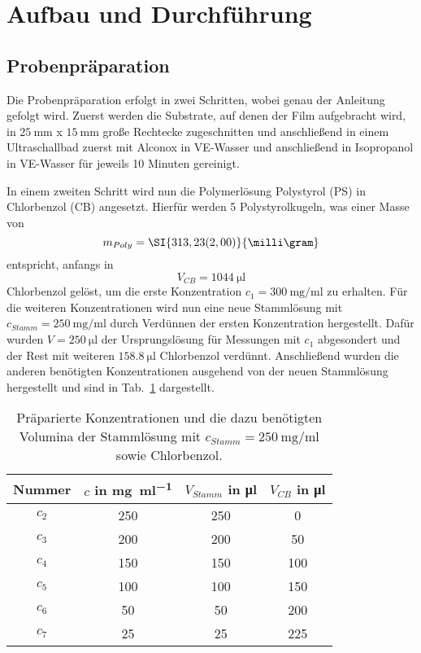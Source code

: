 \section{\label{sec:aufbau}Aufbau und Durchführung} %
\subsection{Probenpräparation}
Die Probenpräparation erfolgt in zwei Schritten, wobei genau der Anleitung~\cite[]{Anleitung} gefolgt wird. Zuerst werden die Substrate, auf denen der Film aufgebracht wird, in $\SI{25}{\milli\metre}$ x $\SI{15}{\milli\metre}$ große Rechtecke zugeschnitten und anschließend in einem Ultraschallbad zuerst mit Alconox in VE-Wasser und anschließend in Isopropanol in VE-Wasser für jeweils 10 Minuten gereinigt.

In einem zweiten Schritt wird nun die Polymerlösung Polystyrol (PS) in Chlorbenzol (CB) angesetzt. Hierfür werden 5 Polystyrolkugeln, was einer Masse von 
\begin{equation*}
    m_{Poly} = \SI{313,23(2,00)}{\milli\gram}
\end{equation*}
entspricht, anfangs in
\begin{equation*}
    V_{CB} = \SI{1044}{\micro\litre}
\end{equation*}
Chlorbenzol gelöst, um die erste Konzentration $c_1 = \SI{300}{\milli\gram\per\milli\litre}$ zu erhalten. Für die weiteren Konzentrationen wird nun eine neue Stammlösung mit $c_{Stamm} = \SI{250}{\milli\gram\per\milli\litre}$ durch Verdünnen der ersten Konzentration hergestellt. Dafür wurden $V = \SI{250}{\micro\litre}$ der Ursprungslösung für Messungen mit $c_1$ abgesondert und der Rest mit weiteren $\SI{158,8}{\micro\litre}$ Chlorbenzol verdünnt. Anschließend wurden die anderen benötigten Konzentrationen ausgehend von der neuen Stammlösung hergestellt und sind in Tab.~\ref{tab:verduennen} dargestellt.

\begin{table}[h!]
    \centering
    \begin{tabular}{|c|c|c|c|}
        \hline
        Nummer & $c$ in \si{\milli\gram\per\milli\litre} & $V_{Stamm}$ in \si{\micro\litre} & $V_{CB}$ in \si{\micro\litre} \\ [0.5ex]
        \hline \hline
        $c_2$ & 250 & 250 & 0\\
        $c_3$ & 200 & 200 & 50\\
        $c_4$ & 150 & 150 & 100\\
        $c_5$ & 100 & 100 & 150\\
        $c_6$ & 50 & 50 & 200\\
        $c_7$ & 25 & 25 & 225\\ [1ex]
        \hline
    \end{tabular}
    \caption{Präparierte Konzentrationen und die dazu benötigten Volumina der Stammlösung mit $c_{Stamm} = \SI{250}{\milli\gram\per\milli\litre}$ sowie Chlorbenzol.}
    \label{tab:verduennen}
\end{table}

